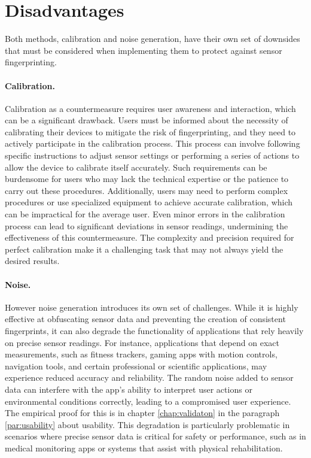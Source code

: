 \documentclass[11pt,
  oneside,openany,    %
]{scrreprt}
\begin{document}
\section{Disadvantages}
\label{sec:disadvantages}
Both methods, calibration and noise generation, have their own set of downsides that must be considered when implementing them to protect against sensor fingerprinting.

\paragraph{Calibration.}
\label{par:calibration_disadvantage}
Calibration as a countermeasure requires user awareness and interaction, which can be a significant drawback. 
Users must be informed about the necessity of calibrating their devices to mitigate the risk of fingerprinting, and they need to actively participate in the calibration process. 
This process can involve following specific instructions to adjust sensor settings or performing a series of actions to allow the device to calibrate itself accurately. 
Such requirements can be burdensome for users who may lack the technical expertise or the patience to carry out these procedures. 
Additionally, users may need to perform complex procedures or use specialized equipment to achieve accurate calibration, which can be impractical for the average user. 
Even minor errors in the calibration process can lead to significant deviations in sensor readings, undermining the effectiveness of this countermeasure. 
The complexity and precision required for perfect calibration make it a challenging task that may not always yield the desired results.

\paragraph{Noise.}
\label{par:noise_disadvantage}
However noise generation introduces its own set of challenges. 
While it is highly effective at obfuscating sensor data and preventing the creation of consistent fingerprints, it can also degrade the functionality of applications that rely heavily on precise sensor readings. 
For instance, applications that depend on exact measurements, such as fitness trackers, gaming apps with motion controls, navigation tools, and certain professional or scientific applications, may experience reduced accuracy and reliability. 
The random noise added to sensor data can interfere with the app's ability to interpret user actions or environmental conditions correctly, leading to a compromised user experience. 
The empirical proof for this is in chapter \ref{chap:validaton} in the paragraph \ref{par:usability} about usability.
This degradation is particularly problematic in scenarios where precise sensor data is critical for safety or performance, such as in medical monitoring apps or systems that assist with physical rehabilitation.
\end{document}
